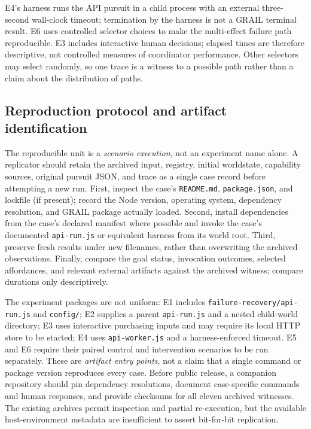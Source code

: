 \documentclass[11pt]{article}
\begin{document}
E4's harness runs the API pursuit in a child process with an external three-second wall-clock timeout; termination by the harness is not a GRAIL terminal result. E6 uses controlled selector choices to make the multi-effect failure path reproducible. E3 includes interactive human decisions; elapsed times are therefore descriptive, not controlled measures of coordinator performance. Other selectors may select randomly, so one trace is a witness to a possible path rather than a claim about the distribution of paths.

\subsection{Reproduction protocol and artifact identification}
The reproducible unit is a \emph{scenario execution}, not an experiment name alone. A replicator should retain the archived input, registry, initial worldstate, capability sources, original pursuit JSON, and trace as a single case record before attempting a new run. First, inspect the case's \texttt{README.md}, \texttt{package.json}, and lockfile (if present); record the Node version, operating system, dependency resolution, and GRAIL package actually loaded. Second, install dependencies from the case's declared manifest where possible and invoke the case's documented \texttt{api-run.js} or equivalent harness from its world root. Third, preserve fresh results under new filenames, rather than overwriting the archived observations. Finally, compare the goal status, invocation outcomes, selected affordances, and relevant external artifacts against the archived witness; compare durations only descriptively.

The experiment packages are not uniform: E1 includes \texttt{failure-recovery/api-run.js} and \texttt{config/}; E2 supplies a parent \texttt{api-run.js} and a nested child-world directory; E3 uses interactive purchasing inputs and may require its local HTTP store to be started; E4 uses \texttt{api-worker.js} and a harness-enforced timeout. E5 and E6 require their paired control and intervention scenarios to be run separately. These are \emph{artifact entry points}, not a claim that a single command or package version reproduces every case. Before public release, a companion repository should pin dependency resolutions, document case-specific commands and human responses, and provide checksums for all eleven archived witnesses. The existing archives permit inspection and partial re-execution, but the available host-environment metadata are insufficient to assert bit-for-bit replication.
\end{document}
